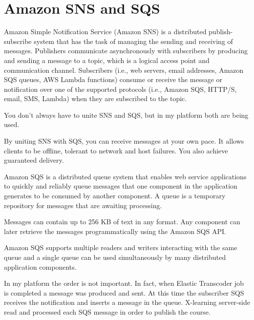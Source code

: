 \section{Amazon SNS and SQS}
\label{sec:Amazon SNS and SQS}


Amazon Simple Notification Service (Amazon SNS) is a distributed publish-subscribe system that has the task of managing the sending and receiving of messages.
Publishers communicate asynchronously with subscribers by producing and sending a message to a topic, which is a logical access point and communication channel. Subscribers (i.e., web servers, email addresses, Amazon SQS queues, AWS Lambda functions) consume or receive the message or notification over one of the supported protocols (i.e., Amazon SQS, HTTP/S, email, SMS, Lambda) when they are subscribed to the topic.\cite{aws_sns}


You don't always have to unite SNS and SQS, but in my platform both are being used.

By uniting SNS with SQS, you can receive messages at your own pace. It allows clients to be offline, tolerant to network and host failures. You also achieve guaranteed delivery.

Amazon SQS is a distributed queue system that enables web service applications to quickly and reliably queue messages that one component in the application generates to be consumed by another component. A queue is a temporary repository for messages that are awaiting processing.

Messages can contain up to 256 KB of text in any format. Any component can later retrieve the messages programmatically using the Amazon SQS API.

Amazon SQS supports multiple readers and writers interacting with the same queue and a single queue can be used simultaneously by many distributed application components.

In my platform the order is not important. In fact, when Elastic Transcoder job is completed a message was produced and sent.
At this time the subscriber SQS receives the notification and inserts a message in the queue. X-learning server-side read and processed each SQS message in order to publish the course.